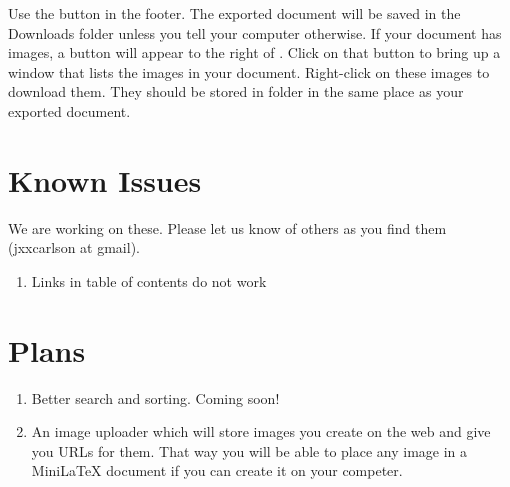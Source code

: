 Use the  button in the footer.  The exported document will be saved in the Downloads folder unless you tell your computer otherwise.  If your document has images, a button  will appear to the right of .  Click on that button to bring up a window that lists the images in your document.  Right-click on these images to download them.  They should be stored in folder  in the same place as your exported document.


\section{Known Issues}

We are working on these.  Please let us know of others as you find them (jxxcarlson at gmail).

\begin{enumerate}

\item Links in table of contents do not work

\end{enumerate}

\section{Plans}


\begin{enumerate}

\item Better search and sorting.  Coming soon!

\item An image uploader which will store images you create on the web and give you URLs for them.  That way you will be able to place any image in a MiniLaTeX document if you can create it on your competer.

\end{enumerate}
